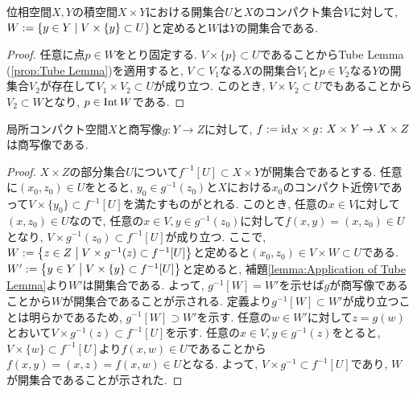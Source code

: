 \documentclass[uplatex, dvipdfmx, a4paper, 12pt, class=jsbook, crop=false]{standalone}
\begin{document}
\begin{lemma}
	\label{lemma:Application of Tube Lemma}
	位相空間$ X, Y $の積空間$ X \times Y $における開集合$ U $と$ X $のコンパクト集合$ V $に対して, $ W \defeq \setcomp{y \in Y}{V \times \{y\} \subset U} $と定めると$ W $は$ Y $の開集合である.
\end{lemma}

\begin{proof}
	任意に点$ p \in W $をとり固定する. $ V \times \{p\} \subset U $であることからTube Lemma (\ref{prop:Tube Lemma})を適用すると, $ V \subset V_1 $なる$ X $の開集合$ V_1 $と$ p \in V_2 $なる$ Y $の開集合$ V_2 $が存在して$ V_1 \times V_2 \subset U $が成り立つ. このとき, $ V \times V_2 \subset U $でもあることから$ V_2 \subset W $となり, $ p \in \mathop{\mathrm{Int}}\nolimits W $である.	
\end{proof}


\begin{theorem}[Whitehead]
	局所コンパクト空間$ X $と商写像$ g \colon Y \to Z $に対して, $ f \mathrel{:=} \mathrm{id}_X \times g \colon X \times Y \to X \times Z $は商写像である.
\end{theorem}

\begin{proof}
$ X \times Z $の部分集合$ U $について$ f^{-1}[U] \subset X \times Y $が開集合であるとする. 任意に$ (x_0, z_0) \in U $をとると, $ y_0 \in g^{-1}(z_0) $と$ X $における$ x_0 $のコンパクト近傍$ V $であって$ V \times \{y_0\} \subset f^{-1}[U] $を満たすものがとれる. このとき, 任意の$x \in V$に対して$ (x, z_0) \in U $なので, 任意の$ x \in V, y \in g^{-1}(z_0) $に対して$ f(x, y) = (x, z_0) \in U $となり, $ V \times g^{-1}(z_0) \subset f^{-1}[U] $が成り立つ. ここで, $ W \defeq \setcomp{z \in Z}{V \times g^{-1}(z) \subset f^{-1}[U]} $と定めると$ (x_0, z_0) \in V \times W \subset U $である. $ W' \defeq \setcomp{y \in Y}{V \times \{y\} \subset f^{-1}[U]} $と定めると, 補題\ref{lemma:Application of Tube Lemma}より$ W' $は開集合である. よって, $ g^{-1}[W] = W' $を示せば$ g $が商写像であることから$ W $が開集合であることが示される. 定義より$ g^{-1}[W] \subset W' $が成り立つことは明らかであるため, $ g^{-1}[W] \supset W' $を示す. 任意の$ w \in W' $に対して$ z = g(w) $とおいて$ V \times g^{-1}(z) \subset f^{-1}[U] $を示す. 任意の$ x \in V, y \in g^{-1}(z) $をとると, $ V \times \{w\} \subset f^{-1}[U] $より$ f(x, w) \in U$であることから$ f(x, y) = (x, z) = f(x, w) \in U $となる. よって, $ V \times  g^{-1} \subset f^{-1}[U] $であり, $ W $が開集合であることが示された.
\end{proof}
\end{document}
